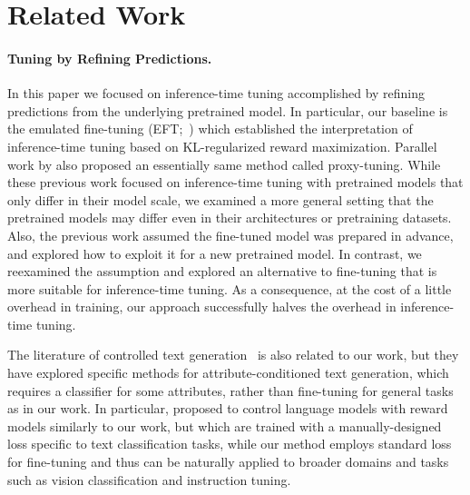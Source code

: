 \section{Related Work}
%

\paragraph{Tuning by Refining Predictions.}
In this paper we focused on inference-time tuning accomplished by refining predictions from the underlying pretrained model.
In particular, our baseline is the emulated fine-tuning (EFT;~\citet{mitchell2024emulator}) which established the interpretation of inference-time tuning based on KL-regularized reward maximization.
Parallel work by \citet{liu2024tuning} also proposed an essentially same method called proxy-tuning.
While these previous work focused on inference-time tuning with pretrained models that only differ in their model scale, we examined a more general setting that the pretrained models may differ even in their architectures or pretraining datasets.
Also, the previous work assumed the fine-tuned model was prepared in advance, and explored how to exploit it for a new pretrained model.
In contrast, we reexamined the assumption  and explored an alternative to fine-tuning that is more suitable for inference-time tuning.
As a consequence, at the cost of a little overhead in training, our approach successfully halves the overhead in inference-time tuning.
%

The literature of controlled text generation~\citep{krause2021gedi,yang2021fudge,pascual2021plug,li2023contrastive,deng2023reward} is also related to our work, but they have explored specific methods for attribute-conditioned text generation, which requires a classifier for some attributes, rather than fine-tuning for general tasks as in our work.
In particular, \citet{deng2023reward} proposed to control language models with reward models similarly to our work, but which are trained with a manually-designed loss specific to text classification tasks, while our method employs  standard loss for fine-tuning and thus can be naturally applied to broader domains and tasks such as vision classification and instruction tuning.

\vspace{-0.3cm}
